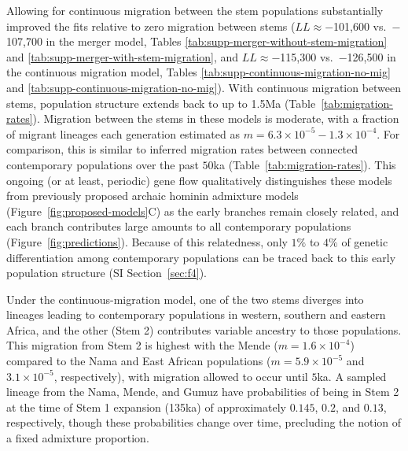 \documentclass[]{article}
\begin{document}
Allowing for continuous migration between the stem populations substantially
improved the fits relative to zero migration between stems ($LL \approx
    -$101,600 vs.\ $-$107,700 in the merger model, Tables
    \ref{tab:supp-merger-without-stem-migration} and
\ref{tab:supp-merger-with-stem-migration}, and $LL \approx -$115,300 vs.\
$-$126,500 in the continuous migration model, Tables
\ref{tab:supp-continuous-migration-no-mig} and
\ref{tab:supp-continuous-migration-no-mig}).  With continuous migration between
stems, population structure extends back to up to 1.5Ma
(Table~\ref{tab:migration-rates}).  Migration between the stems in these models
is moderate, with a fraction of migrant lineages each generation estimated as
$m=6.3\times10^{-5}-1.3\times10^{-4}$. For comparison, this is similar to
inferred migration rates between connected contemporary populations over the
past $50$ka (Table~\ref{tab:migration-rates}). This ongoing (or at least,
periodic) gene flow qualitatively distinguishes these models from previously
proposed archaic hominin admixture models (Figure~\ref{fig:proposed-models}C)
as the early branches remain closely related, and each branch contributes large
amounts to all contemporary populations (Figure~\ref{fig:predictions}).
Because of this relatedness, only $1\%$ to $4\%$ of genetic differentiation
among contemporary populations can be traced back to this early population
structure (SI Section~\ref{sec:f4}).
 
Under the continuous-migration model, one of the two stems diverges into
lineages leading to contemporary populations in western, southern and eastern
Africa, and the other (Stem 2) contributes variable ancestry to those
populations. This migration from Stem 2 is highest with the Mende
($m=1.6\times10^{-4}$) compared to the Nama and East African populations
($m=5.9\times10^{-5}$ and $3.1\times10^{-5}$, respectively), with migration
allowed to occur until $5$ka. A sampled lineage from the Nama, Mende, and Gumuz
have probabilities of being in Stem 2 at the time of Stem 1 expansion (135ka)
of approximately $0.145$, $0.2$, and $0.13$, respectively, though these
probabilities change over time, precluding the notion of a fixed admixture
proportion.
\end{document}
